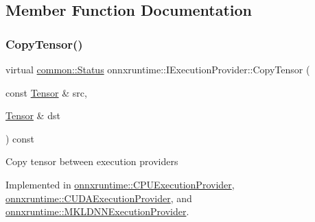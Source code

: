 \subsection{Member Function Documentation}
\mbox{\label{classonnxruntime_1_1IExecutionProvider_a2b9bb47c0d2d72598ceb381688adfe26}} 
\subsubsection{\texorpdfstring{Copy\+Tensor()}{CopyTensor()}\hspace{0.1cm}{\footnotesize\ttfamily [1/2]}}
{\footnotesize\ttfamily virtual \mbox{\hyperlink{classonnxruntime_1_1common_1_1Status}{common\+::\+Status}} onnxruntime\+::\+I\+Execution\+Provider\+::\+Copy\+Tensor (\begin{DoxyParamCaption}\item[{const \mbox{\hyperlink{classonnxruntime_1_1Tensor}{Tensor}} \&}]{src,  }\item[{\mbox{\hyperlink{classonnxruntime_1_1Tensor}{Tensor}} \&}]{dst }\end{DoxyParamCaption}) const\hspace{0.3cm}{\ttfamily [pure virtual]}}

Copy tensor between execution providers 

Implemented in \mbox{\hyperlink{classonnxruntime_1_1CPUExecutionProvider_a6fc53592b62c7774860e59102df871f3}{onnxruntime\+::\+C\+P\+U\+Execution\+Provider}}, \mbox{\hyperlink{classonnxruntime_1_1CUDAExecutionProvider_a6f2ec2e4082683b6de03eeb48acbf546}{onnxruntime\+::\+C\+U\+D\+A\+Execution\+Provider}}, and \mbox{\hyperlink{classonnxruntime_1_1MKLDNNExecutionProvider_a84adc2668cac60f53d2566e03b2080b0}{onnxruntime\+::\+M\+K\+L\+D\+N\+N\+Execution\+Provider}}.

\mbox{\label{classonnxruntime_1_1IExecutionProvider_ac72d136c6a46bb4f33c9a877e01cccaa}} 
